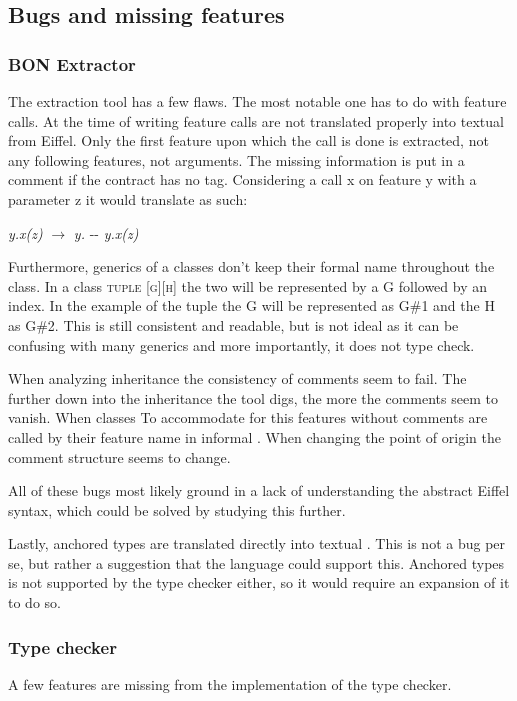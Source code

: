 \subsection{Bugs and missing features}
\subsubsection{BON Extractor}
The \bon{ } extraction tool has a few flaws. The most notable one has to do with feature calls. At the time of writing feature calls are not translated properly into textual \bon{ } from Eiffel. Only the first feature upon which the call is done is extracted, not any following features, not arguments. The missing information is put in a comment if the contract has no tag. Considering a call x on feature y with a parameter z it would translate as such:
\begin{center}
\textit{y.x(z)} $\rightarrow$ \textit{y.} -\-- \textit{y.x(z)}
\end{center}

Furthermore, generics of a classes don't keep their formal name throughout the class. In a class \textsc{tuple [g][h]} the two will be represented by a G followed by an index. In the example of the tuple the G will be represented as G\#1 and the H as G\#2. This is still consistent and readable, but is not ideal as it can be confusing with many generics and more importantly, it does not type check.

When analyzing inheritance the consistency of comments seem to fail. The further down into the inheritance the tool digs, the more the comments seem to vanish. When classes To accommodate for this features without comments are called by their feature name in informal \bon. When changing the point of origin the comment structure seems to change.

All of these bugs most likely ground in a lack of understanding the abstract Eiffel syntax, which could be solved by studying this further.

Lastly, anchored types are translated directly into textual \bon. This is not a bug per se, but rather a suggestion that the \bon{ } language could support this. Anchored types is not supported by the type checker either, so it would require an expansion of it to do so.
\subsubsection{Type checker}
A few features are missing from the implementation of the type checker.

